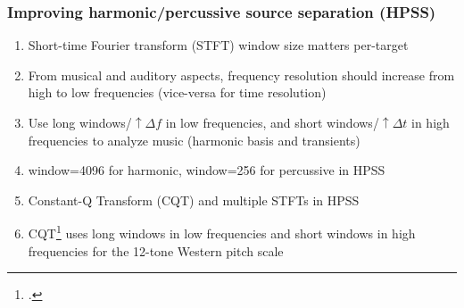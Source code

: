 \documentclass[usenames,dvipsnames]{beamer}
\begin{document}
\begin{frame}
	\frametitle{Improving harmonic/percussive source separation (HPSS)}
	\begin{enumerate}
	\item
		Short-time Fourier transform (STFT) window size matters per-target
	\item
		From musical and auditory aspects, frequency resolution should increase from high to low frequencies (vice-versa for time resolution)
	\item
		Use long windows/$\uparrow \Delta f$ in low frequencies, and short windows/$\uparrow \Delta t$ in high frequencies to analyze music (harmonic basis and transients)
	\item
		window=4096 for harmonic, window=256 for percussive in HPSS
	\item
		Constant-Q Transform (CQT) and multiple STFTs in HPSS
	\item
		CQT\footcite{jbrown, klapuricqt} uses long windows in low frequencies and short windows in high frequencies for the 12-tone Western pitch scale
	\end{enumerate}
\end{frame}
\end{document}

